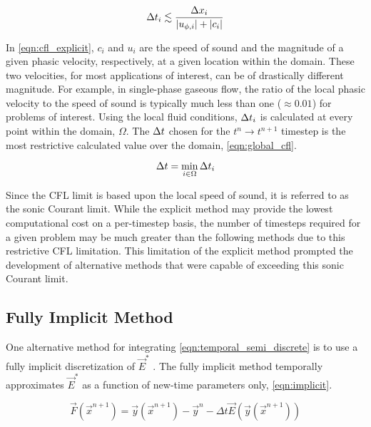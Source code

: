 \begin{equation}
\label{eqn:cfl_explicit}
\dt{}_i \lesssim \frac{\dx{}_i}{|u_{\phi,i}|+|c_i|}
\end{equation}

In \eqref{eqn:cfl_explicit}, $c_i$ and $u_i$ are the speed of sound and the magnitude of a given phasic velocity, respectively, at a given location within the domain.
These two velocities, for most applications of interest, can be of drastically different magnitude.
For example, in single-phase gaseous flow, the ratio of the local phasic velocity to the speed of sound is typically much less than one ($\approx 0.01$) for problems of interest.
Using the local fluid conditions, $\dt{}_i$ is calculated at every point within the domain, $\Omega$.
The $\dt{}$ chosen for the $t^{n} \rightarrow t^{n+1}$ timestep is the most restrictive calculated value over the domain, \eqref{eqn:global_cfl}.

\begin{equation}
\label{eqn:global_cfl}
\dt{} = \min_{i \in \Omega} \dt{}_i
\end{equation}

Since the CFL limit is based upon the local speed of sound, it is referred to as the sonic Courant limit.
While the explicit method may provide the lowest computational cost on a per-timestep basis, the number of timesteps required for a given problem may be much greater than the following methods due to this restrictive CFL limitation.
This limitation of the explicit method prompted the development of alternative methods that were capable of exceeding this sonic Courant limit.

\subsection{Fully Implicit Method}
\label{subsect:numerics_fully_implicit}
One alternative method for integrating \eqref{eqn:temporal_semi_discrete} is to use a fully implicit discretization of $\vec{E}^{*}$ \cite{Frepoli2003, Barre1990}.
The fully implicit method temporally approximates $\vec{E}^{*}$ as a function  of new-time parameters only, \eqref{eqn:implicit}.

\begin{equation}
\label{eqn:implicit}
\vec{F}(\vec{x}^{n+1}) = \vec{y}(\vec{x}^{n+1}) - \vec{y}^{n} - \Delta t \vec{E}(\vec{y}(\vec{x}^{n+1}))
\end{equation}

